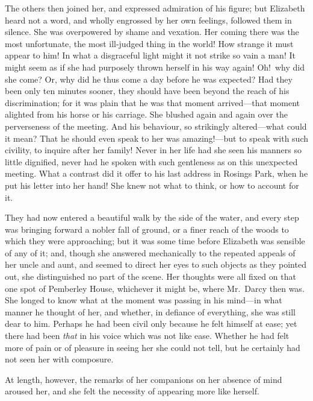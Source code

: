 \documentclass[12pt,english]{book}
\begin{document}
The others then joined her, and expressed admiration of his figure;
but Elizabeth heard not a word, and wholly engrossed by her own feelings,
followed them in silence. She was overpowered by shame and vexation.
Her coming there was the most unfortunate, the most ill-judged thing
in the world! How strange it must appear to him! In what a disgraceful
light might it not strike so vain a man! It might seem as if she had
purposely thrown herself in his way again! Oh!\ why did she come?
Or, why did he thus come a day before he was expected? Had they been
only ten minutes sooner, they should have been beyond the reach of
his discrimination; for it was plain that he was that moment arrived\mbox{--}--that
moment alighted from his horse or his carriage. She blushed again
and again over the perverseness of the meeting. And his behaviour,
so strikingly altered\mbox{---}what could it mean? That he should
even speak to her was amazing!\mbox{---}but to speak with such civility,
to inquire after her family! Never in her life had she seen his manners
so little dignified, never had he spoken with such gentleness as on
this unexpected meeting. What a contrast did it offer to his last
address in Rosings Park, when he put his letter into her hand! She
knew not what to think, or how to account for it.

They had now entered a beautiful walk by the side of the water, and
every step was bringing forward a nobler fall of ground, or a finer
reach of the woods to which they were approaching; but it was some
time before Elizabeth was sensible of any of it; and, though she answered
mechanically to the repeated appeals of her uncle and aunt, and seemed
to direct her eyes to such objects as they pointed out, she distinguished
no part of the scene. Her thoughts were all fixed on that one spot
of Pemberley House, whichever it might be, where Mr.\ Darcy then
was. She longed to know what at the moment was passing in his mind\mbox{---}in
what manner he thought of her, and whether, in defiance of everything,
she was still dear to him. Perhaps he had been civil only because
he felt himself at ease; yet there had been \textit{that} in his voice
which was not like ease. Whether he had felt more of pain or of pleasure
in seeing her she could not tell, but he certainly had not seen her
with composure.

At length, however, the remarks of her companions on her absence of
mind aroused her, and she felt the necessity of appearing more like
herself.
\end{document}
